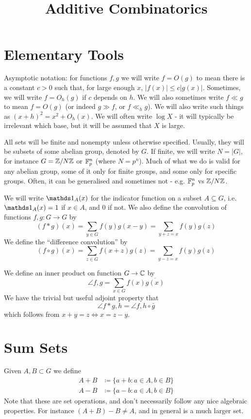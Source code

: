 \documentclass[10pt,a4paper]{article}
\title{Additive Combinatorics}
\begin{document}
\maketitle
\tableofcontents
\newpage
\section{Elementary Tools}
Asymptotic notation: for functions $f, g$ we will write $f = O(g)$ to mean there is a constant $c > 0$ such that, for large enough $x$, $|f(x)| \leq c|g(x)|$. Sometimes, we will write $f = O_h(g)$ if $c$ depends on $h$. We will also sometimes write $f \ll g$ to mean $f=O(g)$ (or indeed $g \gg f$, or $f \ll_h g$). We will also write such things as $(x+h)^2 = x^2 + O_h(x)$. We will often write $\log X$ - it will typically be irrelevant which base, but it will be assumed that $X$ is large.

All sets will be finite and nonempty unless otherwise specified. Usually, they will be subsets of some abelian group, denoted by $G$. If finite, we will write $N = |G|$, for instance $G = \mathbb{Z}/N\mathbb{Z}$ or $\mathbb{F}_p^n$ (where $N = p^n$). Much of what we do is valid for any abelian group, some of it only for finite groups, and some only for specific groups. Often, it can be generalised and sometimes not - e.g. $\mathbb{F}_p^n$ vs $\mathbb{Z}/N\mathbb{Z}$.

We will write $\one_A(x)$ for the indicator function on a subset $A \subseteq G$, i.e. $\one_A(x) = 1$ if $x \in A$, and $0$ if not. We also define the convolution of functions $f, g:G \to G$ by \[(f \ast g)(x) = \sum_{y \in G}f(y)g(x-y) = \sum_{y+z=x}f(y)g(z)\]
We define the ``difference convolution'' by
\[(f \circ g)(x) = \sum_{z\in G}f(x+z)g(z) = \sum_{y-z = x}f(y)g(z)\]

We define an inner product on function $G \to \mathbb{C}$ by
\[\angle{f,g} = \sum_{x\in G}f(x)\overline{g(x)}\]
We have the trivial but useful adjoint property that
\[\angle{f\ast g, h} = \angle{f, h \circ \bar{g}}\]
which follows from $x+y=z \iff x = z-y$.

\section{Sum Sets}
Given $A, B \subset G$ we define
\begin{align*}
  A+B &\coloneqq \{a+b : a \in A, b\in B\}\\
  A-B &\coloneqq \{a-b : a \in A, b\in B\}
\end{align*}
Note that these are set operations, and don't necessarily follow any nice algebraic properties. For instance $(A+B)-B \neq A$, and in general is a much larger set.
\end{document}
